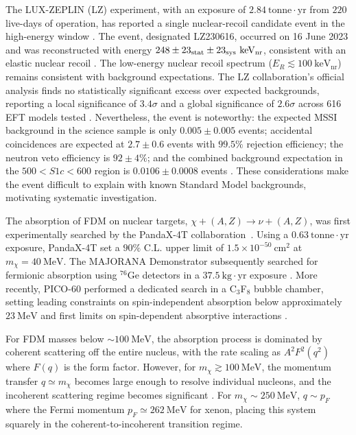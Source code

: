 \documentclass[aps,twocolumn,superscriptaddress,groupedaddress,nofootinbib,floatfix]{revtex4}
\newcommand{\keVnr}{\text{keV}_{\text{nr}}}
\begin{document}
The LUX-ZEPLIN (LZ) experiment, with an exposure of $2.84\ \text{tonne}\cdot\text{yr}$ from $220$ live-days of operation, has reported a single nuclear-recoil candidate event in the high-energy window \cite{LZ2026}. The event, designated LZ230616, occurred on 16 June 2023 and was reconstructed with energy $248\pm23_{\rm stat}\pm23_{\rm sys}\ \keVnr$, consistent with an elastic nuclear recoil \cite{LZ2026}. The low-energy nuclear recoil spectrum ($E_R\lesssim100\ \keVnr$) remains consistent with background expectations. The LZ collaboration's official analysis finds no statistically significant excess over expected backgrounds, reporting a local significance of $3.4\sigma$ and a global significance of $2.6\sigma$ across 616 EFT models tested \cite{LZ2026}. Nevertheless, the event is noteworthy: the expected MSSI background in the science sample is only $0.005\pm0.005$ events; accidental coincidences are expected at $2.7\pm0.6$ events with $99.5\%$ rejection efficiency; the neutron veto efficiency is $92\pm4\%$; and the combined background expectation in the $500<S1c<600$ region is $0.0106\pm0.0008$ events \cite{LZ2026}. These considerations make the event difficult to explain with known Standard Model backgrounds, motivating systematic investigation.

The absorption of FDM on nuclear targets, $\chi+(A,Z)\to\nu+(A,Z)$, was first experimentally searched by the PandaX-4T collaboration~\cite{PandaX:2022osq}. Using a $0.63\ \text{tonne}\cdot\text{yr}$ exposure, PandaX-4T set a $90\%$ C.L. upper limit of $1.5\times10^{-50}\ \text{cm}^2$ at $m_\chi=40\ \text{MeV}$. The MAJORANA Demonstrator subsequently searched for fermionic absorption using $^{76}\text{Ge}$ detectors in a $37.5\ \text{kg}\cdot\text{yr}$ exposure \cite{Majorana:2022gtu}. More recently, PICO-60 performed a dedicated search in a C$_3$F$_8$ bubble chamber, setting leading constraints on spin-independent absorption below approximately $23\ \text{MeV}$ and first limits on spin-dependent absorptive interactions \cite{PICO:2025rku}.

For FDM masses below $\sim100\ \text{MeV}$, the absorption process is dominated by coherent scattering off the entire nucleus, with the rate scaling as $A^2F^2(q^2)$ where $F(q)$ is the form factor. However, for $m_\chi\gtrsim100\ \text{MeV}$, the momentum transfer $q\simeq m_\chi$ becomes large enough to resolve individual nucleons, and the incoherent scattering regime becomes significant \cite{Ge:2024euk}. For $m_\chi\sim250\ \text{MeV}$, $q\sim p_F$ where the Fermi momentum $p_F\simeq262\ \text{MeV}$ for xenon, placing this system squarely in the coherent-to-incoherent transition regime.
\end{document}
